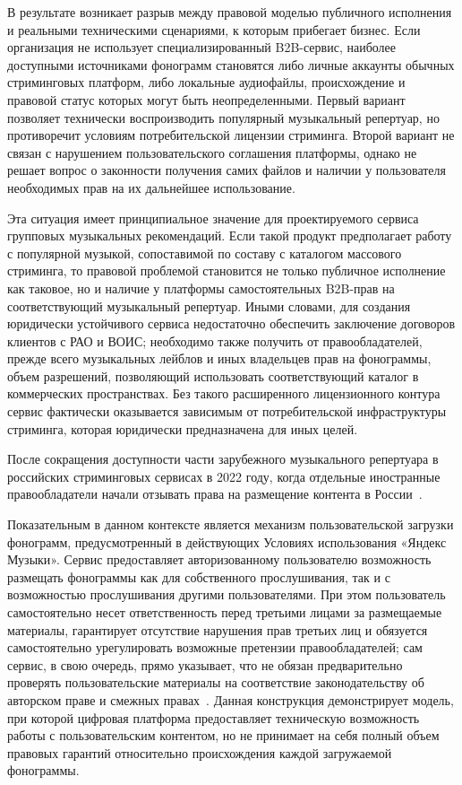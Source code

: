 В результате возникает разрыв между правовой моделью публичного исполнения и реальными техническими сценариями, к которым прибегает бизнес. Если организация не использует специализированный B2B-сервис, наиболее доступными источниками фонограмм становятся либо личные аккаунты обычных стриминговых платформ, либо локальные аудиофайлы, происхождение и правовой статус которых могут быть неопределенными. Первый вариант позволяет технически воспроизводить популярный музыкальный репертуар, но противоречит условиям потребительской лицензии стриминга. Второй вариант не связан с нарушением пользовательского соглашения платформы, однако не решает вопрос о законности получения самих файлов и наличии у пользователя необходимых прав на их дальнейшее использование.

Эта ситуация имеет принципиальное значение для проектируемого сервиса групповых музыкальных рекомендаций. Если такой продукт предполагает работу с популярной музыкой, сопоставимой по составу с каталогом массового стриминга, то правовой проблемой становится не только публичное исполнение как таковое, но и наличие у платформы самостоятельных B2B-прав на соответствующий музыкальный репертуар. Иными словами, для создания юридически устойчивого сервиса недостаточно обеспечить заключение договоров клиентов с РАО и ВОИС; необходимо также получить от правообладателей, прежде всего музыкальных лейблов и иных владельцев прав на фонограммы, объем разрешений, позволяющий использовать соответствующий каталог в коммерческих пространствах. Без такого расширенного лицензионного контура сервис фактически оказывается зависимым от потребительской инфраструктуры стриминга, которая юридически предназначена для иных целей.

После сокращения доступности части зарубежного музыкального репертуара в российских стриминговых сервисах в 2022 году, когда отдельные иностранные правообладатели начали отзывать права на размещение контента в России~\cite{forbes_rights_withdrawal_2022}.

Показательным в данном контексте является механизм пользовательской загрузки фонограмм, предусмотренный в действующих Условиях использования «Яндекс Музыки». Сервис предоставляет авторизованному пользователю возможность размещать фонограммы как для собственного прослушивания, так и с возможностью прослушивания другими пользователями. При этом пользователь самостоятельно несет ответственность перед третьими лицами за размещаемые материалы, гарантирует отсутствие нарушения прав третьих лиц и обязуется самостоятельно урегулировать возможные претензии правообладателей; сам сервис, в свою очередь, прямо указывает, что не обязан предварительно проверять пользовательские материалы на соответствие законодательству об авторском праве и смежных правах~\cite{yandex_music_terms}. Данная конструкция демонстрирует модель, при которой цифровая платформа предоставляет техническую возможность работы с пользовательским контентом, но не принимает на себя полный объем правовых гарантий относительно происхождения каждой загружаемой фонограммы.

